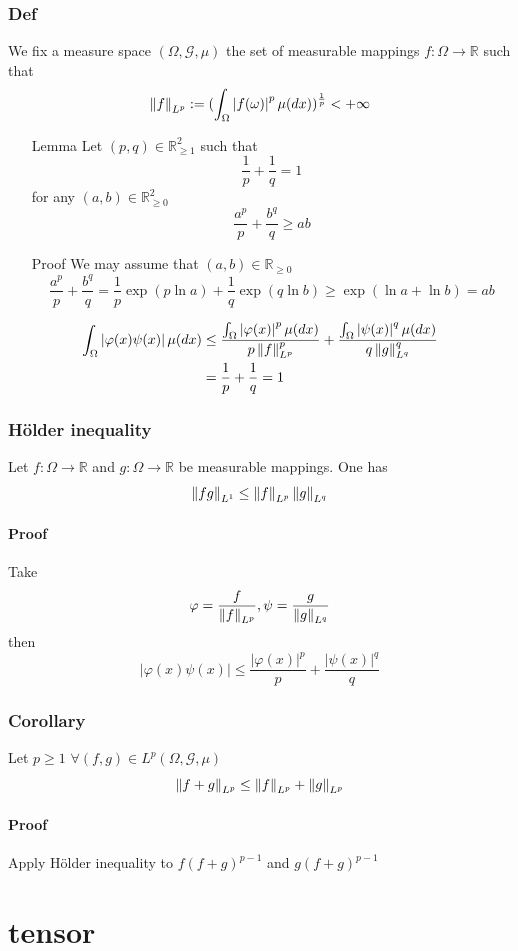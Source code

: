 \documentclass{book}
\newcommand{\abs}[1]{\left\lvert #1 \right\rvert}
\begin{document}
\section{Def}
We fix a measure space $(\Omega,\mathcal{G},\mu)$ the set of measurable mappings $f:\Omega\rightarrow\mathbb{R}$ such that
$$\norm{f}_{L^p}:=(\int_\Omega\abs{f(\omega)}^p\mu(dx))^{\frac{1}p}<+\infty$$
\begin{itemize}
    \item [Lemma]Let $(p,q)\in \mathbb{R}_{\geq1}^2$ such that $$\frac{1}p+\frac{1}{q}=1$$
for any $(a,b)\in \mathbb{R}_{\geq0}^2$$$\frac{a^p}{p}+\frac{b^q}{q}\geq ab$$
    \item [Proof]We may assume that $(a,b)\in \mathbb{R}_{\geq 0}$$$\frac{a^p}{p}+\frac{b^q}{q}=\frac{1}{p}\exp (p\ln a)+\frac{1}{q}\exp (q\ln b)\geq\exp(\ln a+\ln b)=ab$$
\end{itemize}
$$\begin{aligned}
    \int_\Omega\abs{\varphi(x)\psi(x)}\mu(dx) &\leq\frac{\int_\Omega\abs{\varphi(x)}^p\mu(dx)}{p\norm{f}_{L^p}^p}+\frac{\int_\Omega\abs{\psi(x)}^q\mu(dx)}{q\norm{g}_{L^q}^q}\\
    &=\frac{1}{p}+\frac{1}{q}=1
\end{aligned}$$
\section{Hölder inequality}Let $f:\Omega\rightarrow\mathbb{R}$ and $g:\Omega\rightarrow\mathbb{R}$ be measurable mappings. One has 
$$\left\lVert fg \right\rVert_{L^1}\leq\left\lVert f \right\rVert_{L^p}\left\lVert g \right\rVert_{L^q}$$
\subsection*{Proof}
Take$$\varphi=\frac{f}{\left\lVert f \right\rVert_{L^p}},\psi=\frac{g}{\left\lVert g \right\rVert_{L^q}}$$
then
$$\abs{\varphi(x)\psi(x)}\leq\frac{\abs{\varphi(x)}^p}{p}+\frac{\abs{\psi(x)}^q}{q}$$
\section{Corollary}
Let $p\geq1$ $\forall(f,g)\in L^p(\Omega,\mathcal{G},\mu)$$$
\left\lVert f+g \right\rVert_{L^p}\leq\left\lVert f \right\rVert_{L^p}+\left\lVert g \right\rVert_{L^p}$$
\subsection*{Proof}
Apply Hölder inequality to $f(f+g)^{p-1}$ and $g(f+g)^{p-1}$
\part{tensor}
\end{document}

